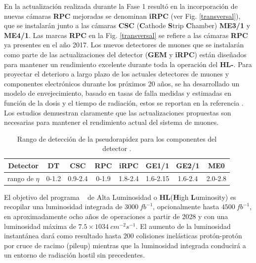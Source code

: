En la actualización realizada durante la Fase 1 resultó en la incorporación de nuevas cámaras \textbf{RPC} mejoradas se denominan \textbf{iRPC} (ver Fig. \ref{transversal}), que se instalarán junto a las cámaras \textbf{CSC} (\textbf{C}athode \textbf{S}trip \textbf{C}hamber) \textbf{ME3/1} y \textbf{ME4/1}. Las marcas \textbf{RPC} en la Fig. \ref{transversal} se refiere a las cámaras \textbf{RPC} ya presentes en el año 2017. Los nuevos detectores de muones que se instalarán como parte de las actualizaciones del detector (\textbf{GEM} y \textbf{iRPC}) están diseñados para mantener un rendimiento excelente durante toda la operación del\textbf{ HL-}\LHC. Para proyectar el deterioro a largo plazo de los actuales detectores de muones y componentes electrónicos durante los próximos 20 años, se ha desarrollado un modelo de envejecimiento, basado en tasas de falla medidas y estimadas en función de la dosis y el tiempo de radiación, estos se reportan en la referencia \cite{hlhlc}. Los estudios demuestran claramente que las actualizaciones propuestas son necesarias para mantener el rendimiento actual del sistema de muones.

\begin{table}[!h]
\small
\centering
\begin{tabular}{|cccccccc|}
\toprule
Detector & \textbf{DT} & \textbf{CSC} & \textbf{RPC} & \textbf{iRPC} & \textbf{GE1/1} & \textbf{GE2/1} & \textbf{ME0}\\ 
\midrule
rango de $\eta$ & 0-1.2 & 0.9-2.4 & 0-1.9 & 1.8-2.4 & 1.6-2.15 & 1.6-2.4 & 2.0-2.8\\ 
\bottomrule
\end{tabular}
\caption{Rango de detección de la pseudorapidez para los componentes del detector \CMS.}
\label{camara}
\end{table}


El objetivo del programa \LHC ~ de Alta Luminosidad o \textbf{HL}(\textbf{H}igh \textbf{L}uminosity) es recopilar una luminosidad integrada de $3000 ~ fb^{-1}$, opcionalmente hasta $4500 ~ fb^{-1}$, en aproximadamente ocho años de operaciones a partir de 2028 y con una luminosidad máxima de $7.5 \times 1034~cm^{-2}s^{-1}$. El aumento de la luminosidad instantánea dará como resultado hasta $200$ colisiones inelásticas protón-protón por cruce de racimo (pileup) mientras que la luminosidad integrada conducirá a un entorno de radiación hostil sin precedentes. %

